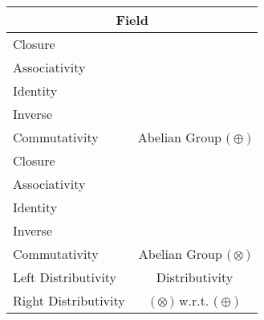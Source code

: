\documentclass[a4paper,12pt]{scrartcl}    %
\newcommand{\OpA}{\otimes}
\newcommand{\OpB}{\oplus}
\begin{document}
\begin{minipage}[c]{0,5\textwidth}

\begin{tabular}{|l|c|} %
  \hline
  \multicolumn{2}{c}{\cellcolor{green!25}Field} \\
  \hline
    \cellcolor{blue!25} Closure& \cellcolor{yellow!25}  \\
    \cellcolor{blue!25} Associativity& \cellcolor{yellow!25}  \\
    \cellcolor{blue!25} Identity& \cellcolor{yellow!25} \\
    \cellcolor{blue!25} Inverse& \cellcolor{yellow!25} \\
    \cellcolor{blue!25} Commutativity& \multirow{-5}{*}{\tiny\cellcolor{yellow!25}Abelian Group $\big(\OpB\big)$} \\
   \hline
    \cellcolor{blue!25} Closure& \cellcolor{yellow!25}  \\
    \cellcolor{blue!25} Associativity& \cellcolor{yellow!25}  \\
    \cellcolor{blue!25} Identity& \cellcolor{yellow!25} \\
    \cellcolor{blue!25} Inverse& \cellcolor{yellow!25} \\
    \cellcolor{blue!25} Commutativity& \multirow{-5}{*}{\tiny\cellcolor{yellow!25}Abelian Group $\big(\OpA\big)$} \\
  \hline
    \cellcolor{blue!25} Left Distributivity&  \tiny\cellcolor{yellow!25}Distributivity\\
    \cellcolor{blue!25} Right Distributivity & \tiny\cellcolor{yellow!25} $\big(\OpA\big)$ w.r.t. $\big(\OpB\big)$  \\
   \hline
\end{tabular}


\end{minipage}
\end{document}
